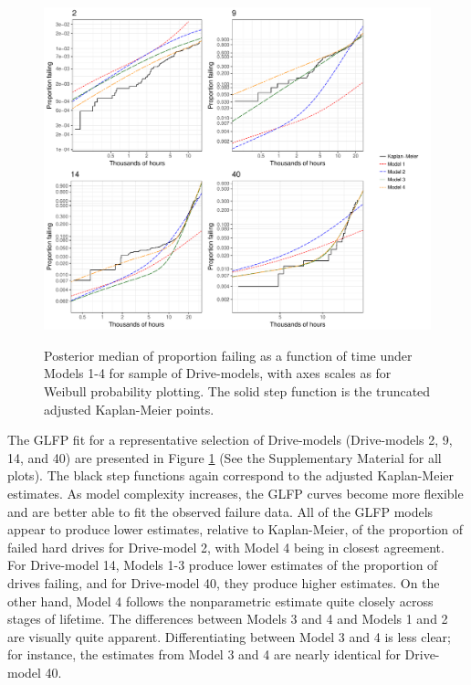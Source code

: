 \documentclass[12pt]{article}
\begin{document}
\begin{figure}[H]
{\centering
\includegraphics[width=\textwidth]{single-drive-4-Models-ex}}
\caption{Posterior median of proportion failing as a function of time under Models 1-4 for sample of Drive-models, with axes scales as for Weibull probability plotting.  The solid step function is the truncated adjusted Kaplan-Meier points.}
\label{fig:mod_comp_leg}
\end{figure}

The GLFP fit for a representative selection of Drive-models (Drive-models 2, 9, 14, and 40) are presented in Figure \ref{fig:mod_comp_leg} (See the Supplementary Material for all plots).  The black step functions again correspond to the adjusted Kaplan-Meier estimates.  As model complexity increases, the GLFP curves become more flexible and are better able to fit the observed failure data.  All of the GLFP models appear to produce lower estimates, relative to Kaplan-Meier, of the proportion of failed hard drives for Drive-model 2, with Model 4 being in closest agreement.  For Drive-model 14, Models 1-3 produce lower estimates of the proportion of drives failing, and for Drive-model 40, they produce higher estimates.  On the other hand, Model 4 follows the nonparametric estimate quite closely across stages of lifetime.  The differences between Models 3 and 4 and Models 1 and 2 are visually quite apparent.  Differentiating between Model 3 and 4 is less clear; for instance, the estimates from Model 3 and 4 are nearly identical for Drive-model 40.
\end{document}

